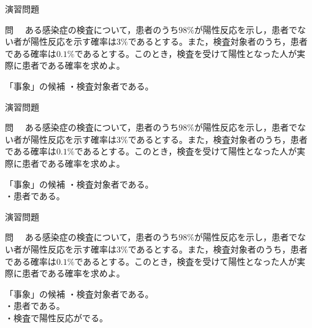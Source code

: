 \documentclass[aspectratio=169, dvipdfmx, 11pt]{beamer}
\begin{document}
\begin{frame}{演習問題}

\begin{block}{問}
　ある感染症の検査について，患者のうち$98\%$が陽性反応を示し，患者でない者が陽性反応を示す確率は$3\%$であるとする。また，検査対象者のうち，患者である確率は$0.1\%$であるとする。このとき，検査を受けて陽性となった人が実際に患者である確率を求めよ。
\end{block}

\begin{alertblock}{「事象」の候補}
・検査対象者である。
\end{alertblock}

\end{frame}


\begin{frame}{演習問題}

\begin{block}{問}
　ある感染症の検査について，患者のうち$98\%$が陽性反応を示し，患者でない者が陽性反応を示す確率は$3\%$であるとする。また，検査対象者のうち，患者である確率は$0.1\%$であるとする。このとき，検査を受けて陽性となった人が実際に患者である確率を求めよ。
\end{block}

\begin{alertblock}{「事象」の候補}
・検査対象者である。\\
・患者である。
\end{alertblock}

\end{frame}


\begin{frame}{演習問題}

\begin{block}{問}
　ある感染症の検査について，患者のうち$98\%$が陽性反応を示し，患者でない者が陽性反応を示す確率は$3\%$であるとする。また，検査対象者のうち，患者である確率は$0.1\%$であるとする。このとき，検査を受けて陽性となった人が実際に患者である確率を求めよ。
\end{block}

\begin{alertblock}{「事象」の候補}
・検査対象者である。\\
・患者である。\\
・検査で陽性反応がでる。
\end{alertblock}

\end{frame}
\end{document}
